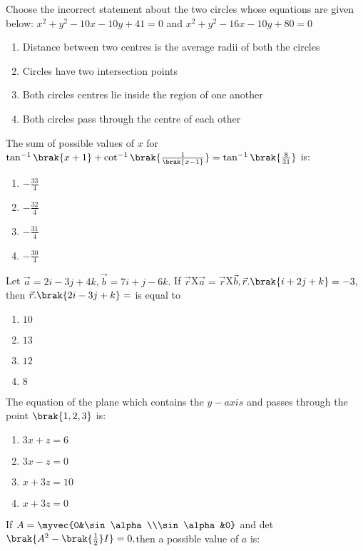     \item  Choose the incorrect statement about the two circles whose equations are given below: $x^2+y^2-10x-10y+41=0$ and $x^2+y^2-16x-10y+80=0$
    \begin{enumerate}
        \item  Distance between two centres is the average radii of both the circles
        \item Circles have two intersection points
        \item Both circles centres lie inside the region of one another
        \item Both circles pass through the centre of each other\\
    \end{enumerate}
    \item  The sum of possible values of $x$ for $\tan^{-1}\brak{x+1}+\cot^{-1}\brak{\frac{1}{\brak{x-1}}}=\tan^{-1}\brak{\frac{8}{31}}$ is:
    \begin{enumerate}
        \item $-\frac{33}{4}$
        \item $-\frac{32}{4}$
        \item $-\frac{31}{4}$
        \item $-\frac{30}{4}$\\
    \end{enumerate}
    \item Let $\vec{a}=2i-3j+4k,\vec{b}=7i+j-6k.$ If $\vec{r}$X$\vec{a}=\vec{r}$X$\vec{b},\vec{r}.\brak{i+2j+k}=-3,$ then $\vec{r}.\brak{2i-3j+k}=$ is equal to
    \begin{enumerate}
        \item $10$
        \item $13$
        \item $12$
        \item $8$
     \end{enumerate}
    \item The equation of the plane which contains the $y-axis$ and passes through the point $\brak{1, 2, 3}$ is:
    \begin{enumerate}
        \item $3x+z=6$
        \item $3x-z=0$
        \item $x+3z=10$
        \item $x+3z=0$\\
    \end{enumerate}
    \item If $A=\myvec{0&\sin\alpha\\\sin\alpha&0}$ and det$\brak{A^2-\brak{\frac{1}{2}}I}=0,$then a possible value of $a$ is:
